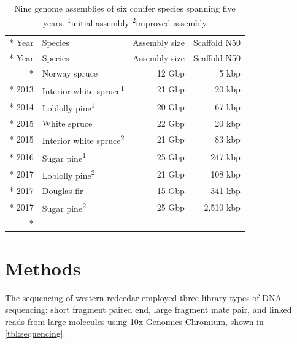 \documentclass[
  12pt,
  oneside,
  openany]{book}
\begin{document}
\hypertarget{tbl:conifer-assemblies}{}
\begin{singlespace}
\small
\begin{longtable}[]{@{}rlrr@{}}
\caption[Nine genome assemblies of six conifer species spanning five years.]{\label{tbl:conifer-assemblies}Nine genome assemblies of six conifer species spanning five years. \textsuperscript{1}initial assembly \textsuperscript{2}improved assembly}\tabularnewline*
\toprule
Year & Species & Assembly size & Scaffold N50\tabularnewline*
\midrule
\endfirsthead
\toprule
Year & Species & Assembly size & Scaffold N50\tabularnewline*
\midrule
\endhead
2013 & Norway spruce & 12 Gbp & 5 kbp\tabularnewline*
2013 & Interior white spruce\textsuperscript{1} & 21 Gbp & 20 kbp\tabularnewline*
2014 & Loblolly pine\textsuperscript{1} & 20 Gbp & 67 kbp\tabularnewline*
2015 & White spruce & 22 Gbp & 20 kbp\tabularnewline*
2015 & Interior white spruce\textsuperscript{2} & 21 Gbp & 83 kbp\tabularnewline*
2016 & Sugar pine\textsuperscript{1} & 25 Gbp & 247 kbp\tabularnewline*
2017 & Loblolly pine\textsuperscript{2} & 21 Gbp & 108 kbp\tabularnewline*
2017 & Douglas fir & 15 Gbp & 341 kbp\tabularnewline*
2017 & Sugar pine\textsuperscript{2} & 25 Gbp & 2,510 kbp\tabularnewline*
\bottomrule
\end{longtable}
\end{singlespace}

\hypertarget{methods-6}{%
\section{Methods}\label{methods-6}}

The sequencing of western redcedar employed three library types of DNA sequencing: short fragment paired end, large fragment mate pair, and linked reads from large molecules using 10x Genomics Chromium, shown in \cref{tbl:sequencing}.
\end{document}
